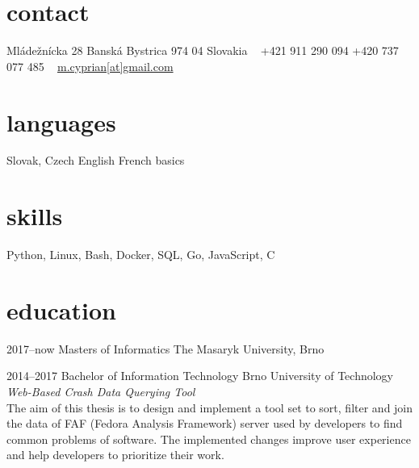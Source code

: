 \documentclass[]{friggeri-cv} %
\begin{document}


\begin{aside} %
\section{contact}
Mládežnícka 28
Banská Bystrica 974 04
Slovakia
~
+421 911 290 094
+420 737 077 485
~
\href{mailto:m.cyprian@gmail.com}{m.cyprian[at]gmail.com}
\section{languages}
Slovak, Czech
English
French basics
\section{skills}
Python, Linux, Bash, Docker, SQL, Go, JavaScript, C
\end{aside}


\section{education}

\begin{entrylist}


\entry
{2017--now}
{Masters {\normalfont of Informatics}}
{The Masaryk University, Brno}


\entry
{2014--2017}
{Bachelor {\normalfont of Information Technology}}
{Brno University of Technology}
{\emph{Web-Based Crash Data Querying Tool} \\ The aim of this thesis is to design and implement a tool set to sort, filter and join the data of FAF (Fedora Analysis Framework) server used by developers to find common problems of software. The implemented changes improve user experience and help developers to prioritize their work.}


\end{entrylist}
\end{document}
